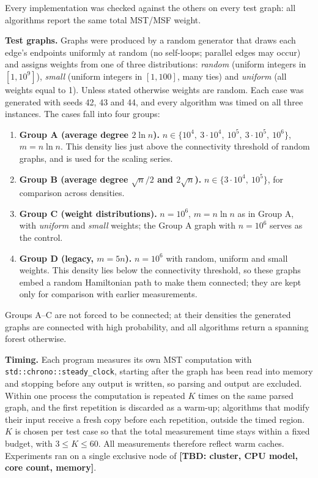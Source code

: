 \documentclass[11pt]{article}
\theoremstyle{plain}
\theoremstyle{remark}
\begin{document}
Every implementation was checked against the others on every test
graph: all algorithms report the same total MST/MSF weight.

\textbf{Test graphs.} Graphs were produced by a random generator that
draws each edge's endpoints uniformly at random (no self-loops; parallel
edges may occur) and assigns weights from one of three distributions:
\emph{random} (uniform integers in \([1, 10^{9}]\)), \emph{small}
(uniform integers in \([1, 100]\), many ties) and \emph{uniform} (all
weights equal to 1). Unless stated otherwise weights are random. Each
case was generated with seeds 42, 43 and 44, and every algorithm was
timed on all three instances. The cases fall into four groups:

\begin{enumerate}
\def\labelenumi{\Alph{enumi}.}
\item
  \textbf{Group A (average degree \(2\ln n\)).}
  \(n \in \{10^4,\ 3\cdot 10^4,\ 10^5,\ 3\cdot 10^5,\ 10^6\}\),
  \(m = n \ln n\). This density lies just above the connectivity
  threshold of random graphs, and is used for the scaling series.
\item
  \textbf{Group B (average degree \(\sqrt{n}/2\) and \(2\sqrt{n}\)).}
  \(n \in \{3\cdot 10^4,\ 10^5\}\), for comparison across densities.
\item
  \textbf{Group C (weight distributions).} \(n = 10^6\), \(m = n\ln n\)
  as in Group A, with \emph{uniform} and \emph{small} weights; the Group
  A graph with \(n = 10^6\) serves as the control.
\item
  \textbf{Group D (legacy, \(m = 5n\)).} \(n = 10^6\) with random,
  uniform and small weights. This density lies below the connectivity
  threshold, so these graphs embed a random Hamiltonian path to make
  them connected; they are kept only for comparison with earlier
  measurements.
\end{enumerate}

Groups A--C are not forced to be connected; at their densities the
generated graphs are connected with high probability, and all
algorithms return a spanning forest otherwise.

\textbf{Timing.} Each program measures its own MST computation with
\texttt{std::chrono::steady\_clock}, starting after the graph has been
read into memory and stopping before any output is written, so parsing
and output are excluded. Within one process the computation is repeated
\(K\) times on the same parsed graph, and the first repetition is
discarded as a warm-up; algorithms that modify their input receive a
fresh copy before each repetition, outside the timed region. \(K\) is
chosen per test case so that the total measurement time stays within a
fixed budget, with \(3 \le K \le 60\). All measurements therefore
reflect warm caches. Experiments ran on a single exclusive node of
\textbf{[TBD: cluster, CPU model, core count, memory]}.
\end{document}
